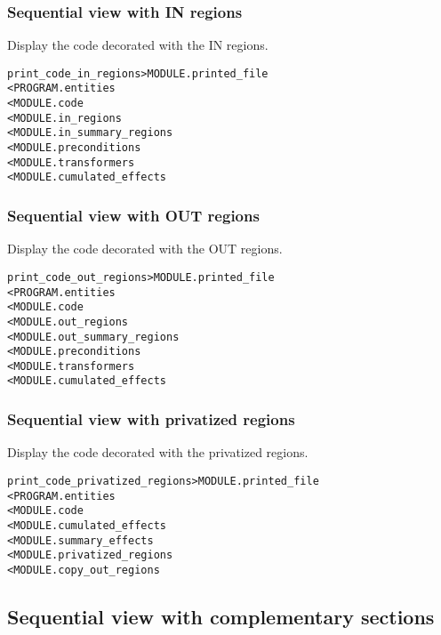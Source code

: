 \documentclass[a4paper]{report}
\newenvironment{PipsMake}{\begin{alltt}}{\end{alltt}}
\begin{document}
\subsubsection{Sequential view with IN regions}

Display the code decorated with the IN regions.

\begin{PipsMake}
print_code_in_regions              > MODULE.printed_file
        < PROGRAM.entities
        < MODULE.code
        < MODULE.in_regions
        < MODULE.in_summary_regions
        < MODULE.preconditions
        < MODULE.transformers
        < MODULE.cumulated_effects
\end{PipsMake}

\subsubsection{Sequential view with OUT regions}

Display the code decorated with the OUT regions.

\begin{PipsMake}
print_code_out_regions              > MODULE.printed_file
        < PROGRAM.entities
        < MODULE.code
        < MODULE.out_regions
        < MODULE.out_summary_regions
        < MODULE.preconditions
        < MODULE.transformers
        < MODULE.cumulated_effects
\end{PipsMake}

\subsubsection{Sequential view with privatized regions}

Display the code decorated with the privatized regions.

\begin{PipsMake}
print_code_privatized_regions       > MODULE.printed_file
        < PROGRAM.entities
        < MODULE.code
        < MODULE.cumulated_effects
        < MODULE.summary_effects
        < MODULE.privatized_regions
        < MODULE.copy_out_regions
\end{PipsMake}

\subsection{Sequential view with complementary sections}
\end{document}
